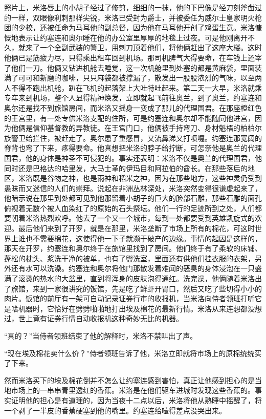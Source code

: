     照片上，米洛唇上的小胡子经过了修剪，细细的一抹，他的下巴像是经刀刻斧凿过的一样，双眼像利刺那样尖锐，米洛已受封为爵士，并被委任为威尔士皇家明火枪团的少校，还被任命为马耳他的副总督，因为他在马耳他开创了鸡蛋生意。米洛慷慨地表示让约塞连和奥尔睡在他的办公室里厚厚的地毯上过夜。可是他刚离开不久，就来了一个全副武装的警卫，用刺刀顶着他们，将他俩赶出了这座大楼。这时他俩已是筋疲力尽，只得乘出租车回到机场。那司机脾气大得要命，在车钱上还宰了他们一刀。他俩又钻进机舱去睡觉，这一次机舱里到处塞的都是黄麻袋，里面装满了可可和新磨的咖啡，只只麻袋都被撑漏了，散发出一股股浓烈的气味，以至两人不得不跑出机舱，趴在飞机的起落架上大吐特吐起来。第二天一大早，米洛就乘专车来到机场，整个人显得精神焕发，立即就起飞前往奥兰，到了奥兰，约塞连和奥尔还是找不到旅馆房间，而米洛又摇身一变成了那儿的代理国君。在那座橙红色的王宫里，有一处专供米洛支配的住所，可是约塞连和奥尔却不能随同他进宫，因为他俩是信仰基督教的异教徒。在王宫门口，他俩被手持弯刀、身材魁梧的柏柏尔族警卫给拦住，被赶走了。奥尔患了重感冒，又流鼻涕又打喷嚏。约塞连那宽阔的脊背也弯了下来，疼得要命。他真想把米洛的脖子给拧断，可怎奈他是奥兰的代理国君，他的身体是神圣不可侵犯的。事实还表明：米洛不仅是奥兰的代理国君，他同时还是巴格达的哈里发，大马士革的伊玛目和阿拉伯的酋长。在那些落后的地区，米洛既是谷物之神，也是雨神和稻米之神，因为在那些地方，这些神灵仍受到愚昧而又迷信的人们的崇拜。说起在非洲丛林深处，米洛突然变得很谦虚起来了，他暗示说在那里到处都可见到他那留着小胡子的巨大的脸部石雕，那些石雕的面孔俯视着无数个被人血染红了的原始的石头祭坛。他们一行的足迹所到之处，人们都要朝着米洛热烈欢呼。他去了一个又一个城市，每到一处都要受到英雄凯旋式的欢迎。最后他们来到了开罗，就是在那里，米洛垄断了市场上所有的棉花，可这时世界上谁也不需要棉花，这使得他一下子就濒于破产的边缘。事情的起因是这样的，那天在开罗，约塞连和奥尔终于在旅馆里找到了房间。他们终于有了柔软的床铺、蓬松的枕头、浆洗干净的被单，也有了盥洗室，里面还有供他们挂衣服的衣架，另外还有水可以洗澡。约塞连和奥尔将他门那散发着难闻的恶臭的身体浸泡在一只盛满了滚烫的热水的大盆里，直到将浑身的皮肤泡得通红。洗完澡，他俩随着米洛出了旅馆，来到一家很讲究的饭馆，先是吃了鲜虾开胃口，然后又吃了些切得小小的肉片。饭馆的前厅有一架可自动记录证券行市的收报机，当米洛向侍者领班打听它是啥机器时，它恰好在劈劈啪啪地打出埃及棉花的最新行情。米洛从来连想都没想过，世上竟有证券行情自动收报机这种奇妙无比的机器。

    “真的？”当侍者领班结束了他的解释时，米洛不禁叫出了声。

    “现在埃及棉花卖什么价？”侍者领班告诉了他，米洛立即就将市场上的原棉统统买了下来。

    然而米洛买下的埃及棉花倒并不怎么让约塞连感到害怕，真正让他感到担心的是当地市场上的一串串青里透红的香蕉。米洛是在他们驱车进城时发现这些香蕉的。事实证明他的担心是有道理的，因为当夜十二点以后，米洛将他从熟睡中摇醒了，将一个剥了一半皮的香蕉硬塞到他的嘴里。约塞连给噎得差点没哭出来。

